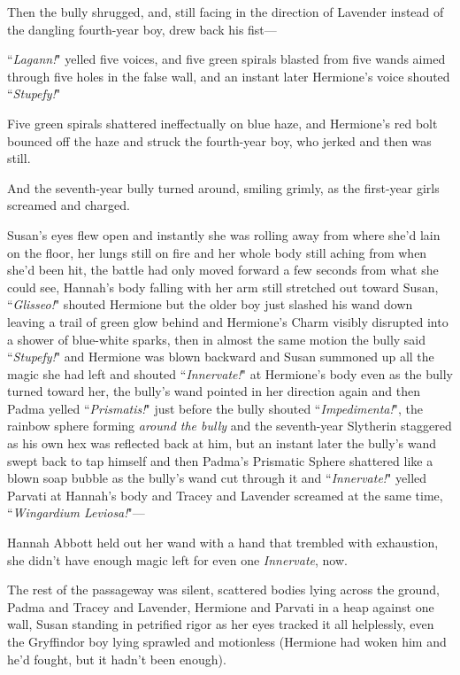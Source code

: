 Then the bully shrugged, and, still facing in the direction of Lavender instead of the dangling fourth-year boy, drew back his fist—

``\emph{Lagann!}" yelled five voices, and five green spirals blasted from five wands aimed through five holes in the false wall, and an instant later Hermione's voice shouted ``\emph{Stupefy!}"

Five green spirals shattered ineffectually on blue haze, and Hermione's red bolt bounced off the haze and struck the fourth-year boy, who jerked and then was still.

And the seventh-year bully turned around, smiling grimly, as the first-year girls screamed and charged.

\later

Susan's eyes flew open and instantly she was rolling away from where she'd lain on the floor, her lungs still on fire and her whole body still aching from when she'd been hit, the battle had only moved forward a few seconds from what she could see, Hannah's body falling with her arm still stretched out toward Susan, ``\emph{Glisseo!}" shouted Hermione but the older boy just slashed his wand down leaving a trail of green glow behind and Hermione's Charm visibly disrupted into a shower of blue-white sparks, then in almost the same motion the bully said ``\emph{Stupefy!}" and Hermione was blown backward and Susan summoned up all the magic she had left and shouted ``\emph{Innervate!}" at Hermione's body even as the bully turned toward her, the bully's wand pointed in her direction again and then Padma yelled ``\emph{Prismatis!}" just before the bully shouted ``\emph{Impedimenta!}", the rainbow sphere forming \emph{around the bully} and the seventh-year Slytherin staggered as his own hex was reflected back at him, but an instant later the bully's wand swept back to tap himself and then Padma's Prismatic Sphere shattered like a blown soap bubble as the bully's wand cut through it and ``\emph{Innervate!}" yelled Parvati at Hannah's body and Tracey and Lavender screamed at the same time, ``\emph{Wingardium Leviosa!}"—

\later

Hannah Abbott held out her wand with a hand that trembled with exhaustion, she didn't have enough magic left for even one \emph{Innervate}, now.

The rest of the passageway was silent, scattered bodies lying across the ground, Padma and Tracey and Lavender, Hermione and Parvati in a heap against one wall, Susan standing in petrified rigor as her eyes tracked it all helplessly, even the Gryffindor boy lying sprawled and motionless (Hermione had woken him and he'd fought, but it hadn't been enough).

